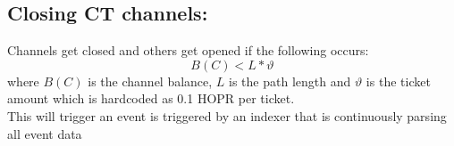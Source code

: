 \subsection{Closing CT channels:}
Channels get closed and others get opened if the following occurs:
  $$B(C) < L * \vartheta$$
where $B(C)$ is the channel balance, $L$ is the path length and $\vartheta$ is the ticket amount which is hardcoded as 0.1 HOPR per ticket.
\\This will trigger an event  is triggered by an indexer that is continuously parsing all event data


